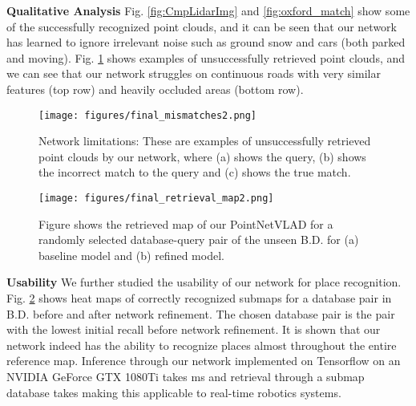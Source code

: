\documentclass[10pt,twocolumn,letterpaper]{article}
\begin{document}
\vspace{-0.2cm}
\noindent\textbf{Qualitative Analysis} Fig. \ref{fig:CmpLidarImg} and \ref{fig:oxford_match} show some of the successfully recognized point clouds, and it can be seen that our network has learned to ignore irrelevant noise such as ground snow and cars (both parked and moving). Fig. \ref{fig:mismatch} shows examples of unsuccessfully retrieved point clouds, and we can see that our network struggles on continuous roads with very similar features (top row) and heavily occluded areas (bottom row). 
\newline
\begin{figure}[t]
	\begin{center}
\texttt{[image: figures/final\_mismatches2.png]}
	\end{center}
	\vspace{-0.4cm}
	\caption{Network limitations: These are examples of unsuccessfully retrieved point clouds by our network, where (a) shows the query, (b) shows the incorrect match to the query and (c) shows the true match.\vspace{-0.2cm}}
	\label{fig:mismatch}
\end{figure}
\begin{figure}[t]
	\begin{center}
\texttt{[image: figures/final\_retrieval\_map2.png]}
	\end{center}
	\vspace{-0.4cm}
	\caption{Figure shows the retrieved map of our PointNetVLAD for a randomly selected database-query pair of the unseen B.D. for (a) baseline model and (b) refined model.\vspace{-0.3cm}}
	\label{fig:map}
\end{figure}

\vspace{-0.2cm}
\noindent\textbf{Usability} We further studied the usability of our network for place recognition. Fig. \ref{fig:map} shows heat maps of correctly recognized submaps for a database pair in B.D. before and after network refinement. The chosen database pair is the pair with the lowest initial recall before network refinement. It is shown that our network indeed has the ability to recognize places almost throughout the entire reference map. Inference through our network implemented on Tensorflow\cite{45381} on an NVIDIA GeForce GTX 1080Ti takes ms and retrieval through a submap database takes  making this applicable to real-time robotics systems.
\newline
\end{document}
